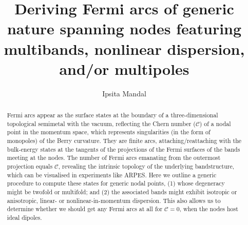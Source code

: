 \documentclass[aps,prl,twocolumn,nofootinbib,showkeys, nolongbibliography, 10pt]{revtex4-2}
\begin{document}
\title{Deriving Fermi arcs of generic nature spanning nodes featuring multibands, nonlinear dispersion, and/or multipoles}


\author{Ipsita Mandal}






\begin{abstract}
Fermi arcs appear as the surface states at the boundary of a three-dimensional topological semimetal with the vacuum, reflecting the Chern number ($\mathcal C$) of a nodal point in the momentum space, which represents singularities (in the form of monopoles) of the Berry curvature. They are finite arcs, attaching/reattaching with the bulk-energy states at the tangents of the projections of the Fermi surfaces of the bands meeting at the nodes. The number of Fermi arcs emanating from the outermost projection equals $\mathcal C$, revealing the intrinsic topology of the underlying bandstructure, which can be visualised in experiments like ARPES. Here we outline a generic procedure to compute these states for generic nodal points, (1) whose degeneracy might be twofold or multifold; and (2) the associated bands might exhibit isotropic or anisotropic, linear- or nonlinear-in-momentum dispersion. This also allows us to determine whether we should get any Fermi arcs at all for $\mathcal C = 0$, when the nodes host ideal dipoles.
\end{abstract}


\maketitle
\end{document}
